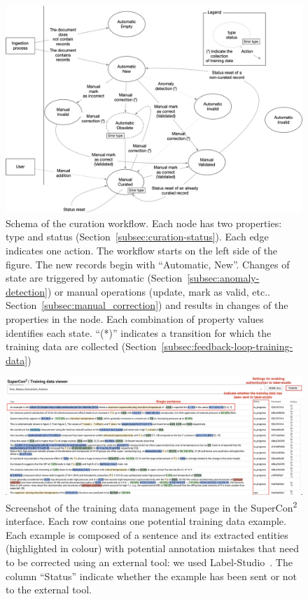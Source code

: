 \documentclass[]{interact}
\theoremstyle{plain} %
\theoremstyle{definition}
\theoremstyle{remark}
\begin{document}
\begin{figure}[ht]
  \centering
  \includegraphics[width=1\textwidth]{images/record-correction} 
  \caption{Schema of the curation workflow. Each node has two properties: type and status (Section~\ref{subsec:curation-status}). Each edge indicates one action. The workflow starts on the left side of the figure. The new records begin with ``Automatic, New''. Changes of state are triggered by automatic (Section~\ref{subsec:anomaly-detection}) or manual operations (update, mark as valid, etc.. Section~\ref{subsec:manual_correction}) and results in changes of the properties in the node. Each combination of property values identifies each state. ``(*)'' indicates a transition for which the training data are collected (Section~\ref{subsec:feedback-loop-training-data})}
  \label{fig:curation-workflow}
\end{figure}

\begin{figure}[ht]
  \centering
  \includegraphics[width=1\textwidth]{images/training-data-viewer} 
  \caption{Screenshot of the training data management page in the SuperCon\textsuperscript{2} interface. Each row contains one potential training data example. Each example is composed of a sentence and its extracted entities (highlighted in colour) with potential annotation mistakes that need to be corrected using an external tool: we used Label-Studio~\cite{Label_Studio}. The column ``Status'' indicate whether the example has been sent or not to the external tool.}
  \label{fig:training-data-view}
\end{figure}
\end{document}
